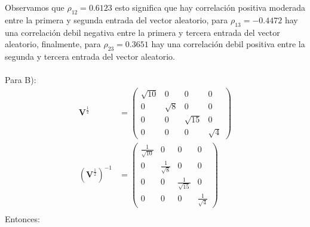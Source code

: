 Observamos que $\rho_{12} = 0.6123$ esto significa que hay correlación positiva moderada entre la primera y segunda entrada del vector aleatorio, para $\rho_{13} = -0.4472$ hay una correlación debil negativa entre la primera y tercera entrada del vector aleatorio, finalmente, para $\rho_{23} = 0.3651$ hay una correlación debil positiva entre la segunda y tercera entrada del vector aleatorio.\\\\
Para B):
\begin{align*}\mathbf{V}^{\frac{1}{2}} &=
\begin{pmatrix}
\sqrt{10} & 0 & 0 & 0\\
0 & \sqrt{8} & 0 & 0\\
0 & 0 & \sqrt{15} & 0\\
0 &0 &0 & \sqrt{4}
\end{pmatrix}\\ 
(\mathbf{V}^{\frac{1}{2}})^{-1} &= 
\begin{pmatrix}
\frac{1}{\sqrt{10}} & 0 & 0 & 0\\
0 &\frac{1}{\sqrt{8}}  & 0 & 0\\
0 & 0 & \frac{1}{\sqrt{15}}  & 0\\
0 &0 &0 & \frac{1}{\sqrt{4}} 
\end{pmatrix}\\ 
\end{align*}
Entonces:
